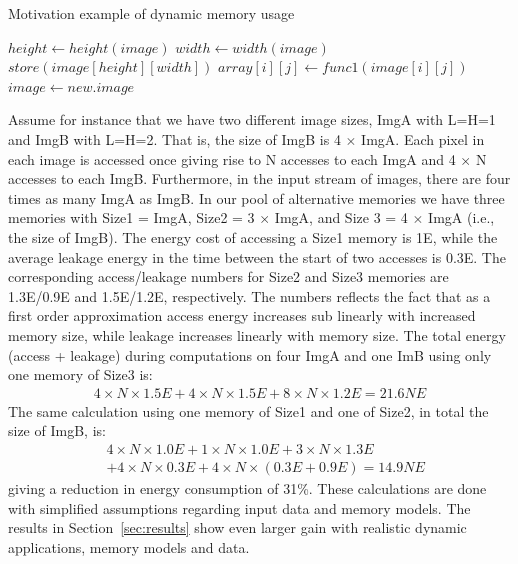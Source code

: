 \documentclass[smallextended]{svjour3}
\begin{document}
\begin{algorithm}
\caption{Motivation example of dynamic memory usage}
 \label{alg:motivation}
 \begin{algorithmic}[1]
		\STATE $height \gets height(image)$
		\STATE $width \gets width(image)$
		\STATE $store(image[height][width])$
					\STATE $array[i][j] \gets func1(image[i][j])$
				\ENDFOR
			\ENDFOR
		\STATE $image \gets new.image$	
	\ENDWHILE
 \end{algorithmic}
\end{algorithm}

Assume for instance that we have two different image sizes, ImgA with L=H=1 and ImgB with L=H=2. 
That is, the size of ImgB is 4 $\times$ ImgA. 
Each pixel in each image is accessed once giving rise to N accesses to each ImgA and 4 $\times$ N accesses to each ImgB. 
Furthermore, in the input stream of images, there are four times as many ImgA as ImgB. 
In our pool of alternative memories we have three memories with Size1 = ImgA, Size2  = 3 $\times$ ImgA, and Size 3 = 4 $\times$ ImgA (i.e., the size of ImgB). 
The energy cost of accessing a Size1 memory is 1E, while the average leakage energy in the time between the start of two accesses is 0.3E. 
The corresponding access/leakage numbers for Size2 and Size3 memories are 1.3E/0.9E and 1.5E/1.2E, respectively. 
The numbers reflects the fact that as a first order approximation access energy increases sub linearly with increased memory size, while leakage increases linearly with memory size. 
The total energy (access + leakage) during computations on four ImgA and one ImB using only one memory of Size3 is:
\begin{align*}
4 \times N \times 1.5E + 4 \times N \times 1.5E + 8 \times N \times 1.2E = 21.6NE
\end{align*}
The same calculation using one memory of Size1 and one of Size2, in total the size of ImgB, is: 
\begin{align*}
& 4 \times N \times 1.0E + 1 \times N \times 1.0E + 3 \times N \times 1.3E \\
& + 4 \times N \times 0.3E + 4 \times N \times (0.3E + 0.9E) =  14.9NE
\end{align*}
giving a reduction in energy consumption of 31\%. 
These calculations are done with simplified assumptions regarding input data and memory models. 
The results in Section~\ref{sec:results} show even larger gain with realistic dynamic applications, memory models and data.
\end{document}
